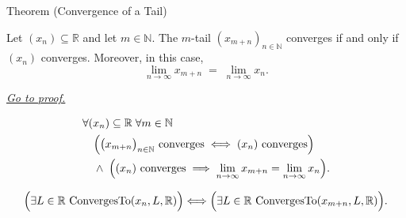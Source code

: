 \begin{theorembox}{Theorem (Convergence of a Tail)}
\begin{theorem}
\label{thm:convergence-of-tail}

Let $(x_n) \subseteq \mathbb{R}$ and let $m \in \mathbb{N}$. The
$m$-tail $(x_{m+n})_{n \in \mathbb{N}}$ converges if and only if
$(x_n)$ converges. Moreover, in this case,
\[
    \lim_{n \to \infty} x_{m+n} \;=\; \lim_{n \to \infty} x_n.
\]

\smallskip
\noindent
\hyperref[prf:convergence-of-tail]{\textit{Go to proof.}}
\end{theorem}
\end{theorembox}

\begin{remark*}
\[
\begin{aligned}
&\forall (x_n) \subseteq \mathbb{R} \;\forall m \in \mathbb{N}\\
&\quad\Bigl(
    \bigl(x_{m+n}\bigr)_{n \in \mathbb{N}} \text{ converges}
    \;\Longleftrightarrow\;
    (x_n) \text{ converges}
\Bigr)\\
&\quad\land\;\Bigl(
    (x_n) \text{ converges}
    \;\Longrightarrow\;
    \lim_{n\to\infty} x_{m+n} = \lim_{n\to\infty} x_n
\Bigr).
\end{aligned}
\]
\end{remark*}

\begin{remark*}
\[
\Bigl(\exists L\in\mathbb{R}\,\operatorname{ConvergesTo}(x_n,L,\mathbb{R})\Bigr)
\Longleftrightarrow
\Bigl(\exists L\in\mathbb{R}\,\operatorname{ConvergesTo}(x_{m+n},L,\mathbb{R})\Bigr).
\]
\end{remark*}

